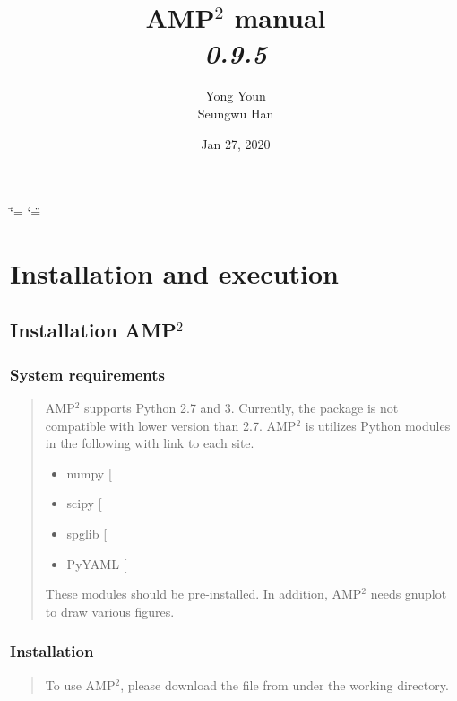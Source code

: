 \documentclass[letterpaper,10pt,english]{sphinxmanual}
\title{AMP$^\text{2}$ manual \\ \textit{0.9.5}}
\date{Jan 27, 2020}
\author{Yong Youn \\ Seungwu Han}
\begin{document}
\ifdefined\shorthandoff
  \ifnum\catcode`\=\string=\active\shorthandoff{=}\fi
  \ifnum\catcode`\"=\active{}\fi
\fi

\pagestyle{empty}
\sphinxmaketitle
\pagestyle{plain}
\sphinxtableofcontents
\pagestyle{normal}
\label{\detokenize{index::doc}}



\chapter{Installation and execution}
\label{\detokenize{Installation/Installation:installation-and-execution}}\label{\detokenize{Installation/Installation::doc}}

\section{Installation AMP$^{\text{2}}$}
\label{\detokenize{Installation/Installation:installation-amp2}}

\subsection{System requirements}
\label{\detokenize{Installation/Installation:system-requirements}}\begin{quote}

AMP$^{\text{2}}$ supports Python 2.7 and 3. Currently, the package is not compatible
with lower version than 2.7. AMP$^{\text{2}}$ is utilizes Python modules
in the following with link to each site.
\begin{itemize}
\item {} 
numpy {[}\sphinxurl{https://www.numpy.org}{]}

\item {} 
scipy {[}\sphinxurl{https://www.scipy.org}{]}

\item {} 
spglib {[}\sphinxurl{https://atztogo.github.io/spglib}{]}

\item {} 
PyYAML {[}\sphinxurl{https://pypi.org/project/PyYAML}{]}

\end{itemize}

These modules should be pre-installed. In addition, AMP$^{\text{2}}$ needs gnuplot to draw
various figures.
\end{quote}


\subsection{Installation}
\label{\detokenize{Installation/Installation:installation}}\begin{quote}

To use AMP$^{\text{2}}$, please download the file from  under the
working directory.
\end{quote}
\end{document}
